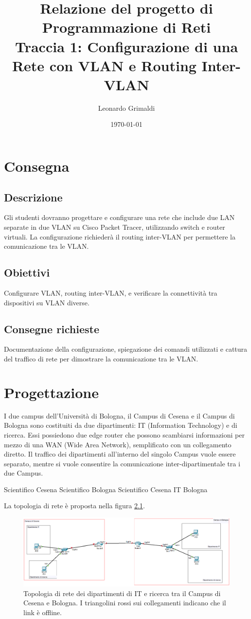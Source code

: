 \documentclass[a4paper,12pt]{report}
\title{Relazione del progetto di Programmazione di Reti 
    \\ Traccia 1: Configurazione di una Rete con VLAN e Routing Inter-VLAN}
\author{Leonardo Grimaldi}
\date{\today}
\newcommand{\myexample}[2]{
    \begin{tcolorbox}[colback=black!5!white,colframe=black,title={Esempio: #1}]
        #2
    \end{tcolorbox}
}
\begin{document}
\maketitle
\tableofcontents
\chapter{Consegna}
\section{Descrizione}
Gli studenti dovranno progettare e configurare una rete che include due LAN separate in due VLAN su Cisco Packet Tracer, utilizzando switch e router virtuali. La configurazione richiederà il routing inter-VLAN per permettere la comunicazione tra le VLAN.
\section{Obiettivi}
Configurare VLAN, routing inter-VLAN, e verificare la connettività tra dispositivi su VLAN diverse.
\section{Consegne richieste}
Documentazione della configurazione, spiegazione dei comandi utilizzati e cattura del traffico di rete per dimostrare la comunicazione tra le VLAN.
\chapter{Progettazione}
\label{chap:progettazione}
I due campus dell'Università di Bologna, il Campus di Cesena e il Campus di Bologna sono costituiti da due dipartimenti: IT (Information Technology) e di ricerca.
%
Essi possiedono due edge router che possono scambiarsi informazioni per mezzo di una WAN (Wide Area Network), semplificato con un collegamento diretto.
%
Il traffico dei dipartimenti all'interno del singolo Campus vuole essere separato, mentre si vuole consentire la comunicazione inter-dipartimentale tra i due Campus.
%
\myexample{Ping tra i Campus}{
    Scientifico Cesena Scientifico Bologna
    Scientifico Cesena  IT Bologna
}
La topologia di rete è proposta nella figura \ref{fig:topologia_offline}. 
\begin{figure}
\includegraphics[width=\textwidth]{offline_topology_with_departments.png}
\caption{
    Topologia di rete dei dipartimenti di IT e ricerca tra il Campus di Cesena e Bologna.
    I triangolini rossi sui collegamenti indicano che il link è offline.
    }
\label{fig:topologia_offline}
\end{figure}
\end{document}
